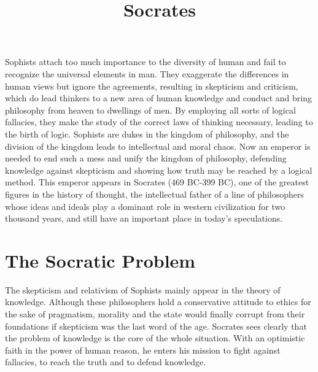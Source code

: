 \documentclass[11pt]{article}
\title{Socrates}
\date{}
\begin{document}
\begin{sloppypar}
  \maketitle

  \linenumbers
Sophists attach too much importance to the diversity of human and fail to recognize the universal elements in man. 
They exaggerate the differences in human views but ignore the agreements, resulting in skepticism and criticism, which do lead thinkers to a new area of human knowledge and conduct and bring philosophy from heaven to dwellings of men. 
By employing all sorts of logical fallacies, they make the study of the correct laws of thinking necessary, leading to the birth of logic. 
Sophists are dukes in the kingdom of philosophy, and the division of the kingdom leads to intellectual and moral chaos. 
Now an emperor is needed to end such a mess and unify the kingdom of philosophy, defending knowledge against skepticism and showing how truth may be reached by a logical method. 
This emperor appears in Socrates (469 BC-399 BC), one of the greatest figures in the history of thought, the intellectual father of a line of philosophers whose ideas and ideals play a dominant role in western civilization for two thousand years, and still have an important place in today’s speculations.

\section{The Socratic Problem}
The skepticism and relativism of Sophists mainly appear in the theory of knowledge. 
Although these philosophers hold a conservative attitude to ethics for the sake of pragmatism, morality and the state would finally corrupt from their foundations if skepticism was the last word of the age. 
Socrates sees clearly that the problem of knowledge is the core of the whole situation. 
With an optimistic faith in the power of human reason, he enters his mission to fight against fallacies, to reach the truth and to defend knowledge.

\par


\end{sloppypar}
\end{document}
